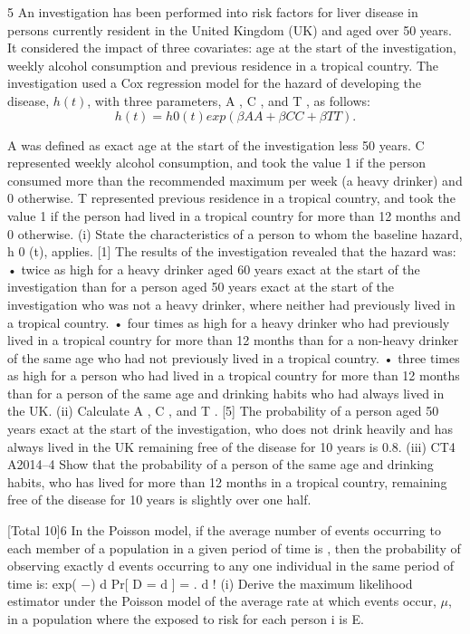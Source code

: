 \documentclass[a4paper,12pt]{article}
\begin{document}
\begin{enumerate}
5
An investigation has been performed into risk factors for liver disease in persons
currently resident in the United Kingdom (UK) and aged over 50 years. It considered
the impact of three covariates: age at the start of the investigation, weekly alcohol
consumption and previous residence in a tropical country.
The investigation used a Cox regression model for the hazard of developing the
disease, $h(t)$, with three parameters, \beta A , \beta C , and \beta T , as follows:
\[h ( t ) = h 0 ( t ) exp( \beta A A + \beta C C + \beta T T ).\]

A was defined as exact age at the start of the investigation less 50 years.
C represented weekly alcohol consumption, and took the value 1 if the person
consumed more than the recommended maximum per week (a heavy drinker) and 0
otherwise.
T represented previous residence in a tropical country, and took the value 1 if the person had lived in a tropical country for more than 12 months and 0 otherwise.
(i)
State the characteristics of a person to whom the baseline hazard, h 0 (t),
applies.
[1]
The results of the investigation revealed that the hazard was:
• twice as high for a heavy drinker aged 60 years exact at the start of the investigation than for a person aged 50 years exact at the start of the investigation who was not a heavy drinker, where neither had previously lived in a tropical country.
• four times as high for a heavy drinker who had previously lived in a tropical country for more than 12 months than for a non-heavy drinker of the same age
who had not previously lived in a tropical country.
• three times as high for a person who had lived in a tropical country for more than 12 months than for a person of the same age and drinking habits who had always
lived in the UK.
(ii)
Calculate \beta A , \beta C , and \beta T .
[5]
The probability of a person aged 50 years exact at the start of the investigation, who does not drink heavily and has always lived in the UK remaining free of the disease for 10 years is 0.8.
(iii)
CT4 A2014–4
Show that the probability of a person of the same age and drinking habits, who has lived for more than 12 months in a tropical country, remaining free of the disease for 10 years is slightly over one half.

[Total 10]6
In the Poisson model, if the average number of events occurring to each member of a population in a given period of time is \lambda, then the probability of observing exactly d events occurring to any one individual in the same period of time is:
exp( −\lambda ) \lambda d
Pr[ D = d ] =
.
d !
(i)
Derive the maximum likelihood estimator under the Poisson model of the average rate at which events occur, $\mu$, in a population where the exposed to risk for each person i is E.


\end{enumerate}
\end{document}
